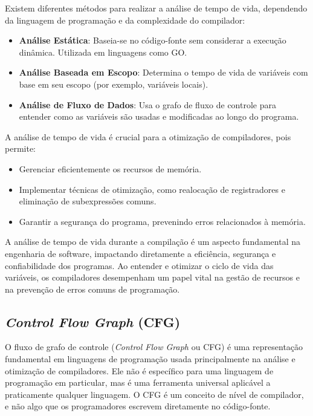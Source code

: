 \documentclass{article}
\begin{document}
    Existem diferentes métodos para realizar a análise de tempo de vida, dependendo da linguagem de programação e da complexidade do compilador:

    \begin{itemize}
        \item \textbf{Análise Estática}: Baseia-se no código-fonte sem considerar a execução dinâmica.
        Utilizada em linguagens como GO.

        \item \textbf{Análise Baseada em Escopo}: Determina o tempo de vida de variáveis com base em
        seu escopo (por exemplo, variáveis locais).

        \item \textbf{Análise de Fluxo de Dados}: Usa o grafo de fluxo de controle para entender
        como as variáveis são usadas e modificadas ao longo do programa.
    \end{itemize}

    A análise de tempo de vida é crucial para a otimização de compiladores, pois permite:

    \begin{itemize}
        \item Gerenciar eficientemente os recursos de memória.

        \item Implementar técnicas de otimização, como realocação de registradores e eliminação de subexpressões comuns.

        \item Garantir a segurança do programa, prevenindo erros relacionados à memória.
    \end{itemize}

    A análise de tempo de vida durante a compilação é um aspecto fundamental na engenharia de software,
    impactando diretamente a eficiência, segurança e confiabilidade dos programas. Ao entender e
    otimizar o ciclo de vida das variáveis, os compiladores desempenham um papel vital na gestão
    de recursos e na prevenção de erros comuns de programação.

    \subsection*{\emph{Control Flow Graph} (CFG)}

    O fluxo de grafo de controle (\emph{Control Flow Graph} ou CFG) é uma representação fundamental em linguagens
    de programação usada principalmente na análise e otimização de compiladores. Ele não é específico para uma
    linguagem de programação em particular, mas é uma ferramenta universal aplicável a praticamente qualquer linguagem.
    O CFG é um conceito de nível de compilador, e não algo que os programadores escrevem diretamente no código-fonte.
\end{document}
